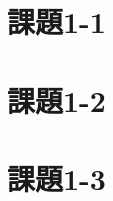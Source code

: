 \documentclass[a4j,11pt]{jarticle}
\begin{document}
\section{課題1-1}






\section{課題1-2}



\section{課題1-3}
\end{document}
